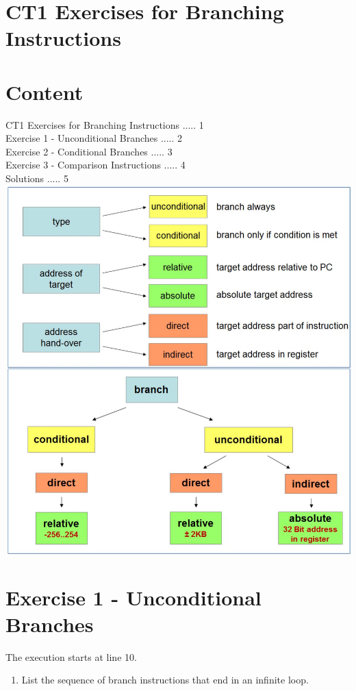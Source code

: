 \documentclass[10pt]{article}
\begin{document}
\section*{CT1 Exercises for Branching Instructions}
\section*{Content}
CT1 Exercises for Branching Instructions ..... 1\\
Exercise 1 - Unconditional Branches ..... 2\\
Exercise 2 - Conditional Branches ..... 3\\
Exercise 3 - Comparison Instructions ..... 4\\
Solutions ..... 5\\
\includegraphics[max width=\textwidth, center]{2025_01_02_9902c2d2685de638ef73g-1}

\section*{Exercise 1 - Unconditional Branches}
The execution starts at line 10.

\begin{enumerate}
  \item List the sequence of branch instructions that end in an infinite loop.
\end{enumerate}
\end{document}
